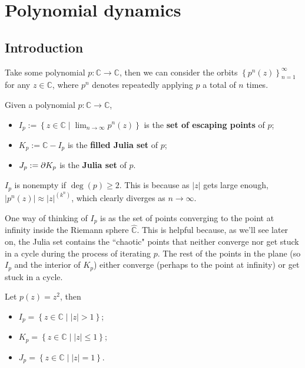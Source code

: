 \documentclass[twoside,10pt]{report}
\begin{document}
\toc
\footer


\chapter{Polynomial dynamics}

\section{Introduction}

Take some polynomial $p: \mathbb{C}\to \mathbb{C}$, then we can consider the orbits $\left\{ p^{n}(z) \right\}_{n=1}^{\infty}$ for any $z \in \mathbb{C}$, where $p^{n}$ denotes repeatedly applying $p$ a total of $n$ times.

\begin{defn}[]
Given a polynomial $p:\mathbb{C}\to \mathbb{C}$,
\begin{itemize}
	\item $I_{p} := \left\{ z \in \mathbb{C} \;|\; \lim_{n \to \infty} p^{n}(z) \right\}$ is the \textbf{set of escaping points} of $p$;
	\item $K_{p} := \mathbb{C} - I_{p}$ is the \textbf{filled Julia set} of $p$;
	\item $J_{p} := \partial K_{p}$ is the \textbf{Julia set} of $p$.
\end{itemize}
\end{defn}
$I_{p}$ is nonempty if $\deg(p) \geq 2$. This is because as $|z|$ gets large enough, $|p^{n}(z)| \approx |z|^{(k^{n})}$, which clearly diverges as $n\to \infty$.

One way of thinking of $I_{p}$ is as the set of points converging to the point at infinity inside the Riemann sphere $\mathbb{\hat{C}}$. This is helpful because, as we'll see later on, the Julia set contains the ``chaotic" points that neither converge nor get stuck in a cycle during the process of iterating $p$. The rest of the points in the plane (so $I_{p}$ and the interior of $K_{p}$) either converge (perhaps to the point at infinity) or get stuck in a cycle.

\begin{ex}[]
Let $p(z) = z^2$, then
\begin{itemize}
	\item $I_{p} = \left\{ z\in \mathbb{C}\;|\; |z| > 1 \right\}$;
	\item $K_{p} = \left\{ z\in\mathbb{C} \;|\; |z|\leq 1 \right\}$;
	\item $J_{p} = \left\{ z\in\mathbb{C} \;|\; |z|=1 \right\}$.
\end{itemize}
\end{ex}
\end{document}
